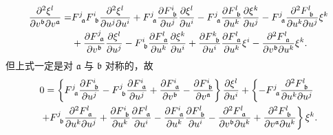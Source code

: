 \begin{align*}
    \frac{\partial^2 \xi^l}{\partial v^{\mathfrak{b}} \partial v^{\mathfrak{a}}}= & 
    F^j_{\hphantom{j}\mathfrak{a}} F^i_{\hphantom{i}\mathfrak{b}} 
    \frac{\partial^2 \xi^l}{\partial u^j \partial u^i}+F^j_{\hphantom{j}\mathfrak{a}} 
    \frac{\partial F^i_{\hphantom{i}\mathfrak{b}}}{\partial u^j} \frac{\partial \xi^l}{\partial u^i} 
    -F^j_{\hphantom{j}\mathfrak{a}} \frac{\partial F^l_{\hphantom{l}\mathfrak{b}}}{\partial u^k}
     \frac{\partial \xi^k}{\partial u^j}      -F^j_{\hphantom{j}\mathfrak{a}} 
     \frac{\partial^2 F^l_{\hphantom{l}\mathfrak{b}}}{\partial u^k \partial u^j} \xi^k \\
    & +\frac{\partial F^j_{\hphantom{j}\mathfrak{a}}}{\partial v^{\mathfrak{b}}} \frac{\partial \xi^l}{\partial u^j} 
    -F^i_{\hphantom{i}\mathfrak{b}} \frac{\partial F^l_{\hphantom{l}\mathfrak{a}}}{\partial u^k} 
    \frac{\partial \xi^k}{\partial u^i}+\frac{\partial F^k_{\hphantom{k}\mathfrak{b}}}{\partial u^i} 
    \frac{\partial F^l_{\hphantom{l}\mathfrak{a}}}{\partial u^k} \xi^i
    -\frac{\partial^2 F^l_{\hphantom{l}\mathfrak{a}}}{\partial v^{\mathfrak{b}} \partial u^k} \xi^k .
\end{align*}
但上式一定是对 $\mathfrak{a}$ 与 $\mathfrak{b}$ 对称的，故
\begin{equation}\label{chhss:eqn_tmp-xif}
    \begin{aligned}
        &0=  \left\{F^j_{\hphantom{j}\mathfrak{a}} \frac{\partial F^i_{\hphantom{i}\mathfrak{b}}}{\partial u^j}
        -F^j_{\hphantom{j}\mathfrak{b}} \frac{\partial F^i_{\hphantom{i}\mathfrak{a}}}{\partial u^j}
        +\frac{\partial F^i_{\hphantom{i}\mathfrak{a}}}{\partial v^{\mathfrak{b}}}
        -\frac{\partial F^i_{\hphantom{i}\mathfrak{b}}}{\partial v^{\mathfrak{a}}}\right\} 
        \frac{\partial \xi^l}{\partial u^i} 
        +\left\{-F^j_{\hphantom{j}\mathfrak{a}} \frac{\partial^2 F^l_{\hphantom{l}\mathfrak{b}}}
        {\partial u^k \partial u^j} \right. \\
        &\left. +F^j_{\hphantom{j}\mathfrak{b}} \frac{\partial^2 F^l_{\hphantom{l}\mathfrak{a}}}
        {\partial u^k \partial u^j}+\frac{\partial   F^i_{\hphantom{i}\mathfrak{b}}}{\partial u^k} 
        \frac{\partial F^l_{\hphantom{l}\mathfrak{a}}}{\partial u^i}
        -\frac{\partial F^i_{\hphantom{i}\mathfrak{a}}}{\partial u^k} 
        \frac{\partial F^l_{\hphantom{l}\mathfrak{b}}}{\partial u^i}
        -\frac{\partial^2 F^l_{\hphantom{l}\mathfrak{a}}}{\partial v^{\mathfrak{b}} \partial u^k}
        +\frac{\partial^2 F^l_{\hphantom{l}\mathfrak{b}}}{\partial v^{\mathfrak{a}} \partial u^k}\right\} \xi^k .
    \end{aligned}
\end{equation}
